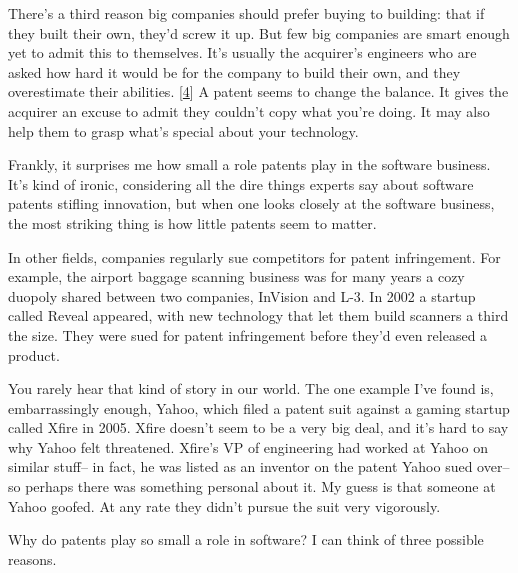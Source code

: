 There's a third reason big companies
                  should prefer buying to building: that if they built their
                  own, they'd screw it up. But few big companies are smart
                  enough yet to admit this to themselves. It's usually the
                  acquirer's engineers who are asked how hard it would be for
                  the company to build their own, and they overestimate their
                  abilities.
                  [\href{\#f4n}{4}]
                  A patent seems to change the balance. It gives the acquirer an
                  excuse to admit they couldn't copy what you're doing. It may
                  also help them to grasp what's special about your
                  technology.

Frankly, it surprises me how small a
                  role patents play in the software business. It's kind of
                  ironic, considering all the dire things experts say about
                  software patents stifling innovation, but when one looks
                  closely at the software business, the most striking thing is
                  how little patents seem to matter.

In other fields,
                  companies regularly sue competitors for patent infringement.
                  For example, the airport baggage scanning business was for
                  many years a cozy duopoly shared between two companies,
                  InVision and L-3. In 2002 a startup called Reveal appeared,
                  with new technology that let them build scanners a third the
                  size. They were sued for patent infringement before they'd
                  even released a product.

You rarely hear that kind
                  of story in our world. The one example I've found is,
                  embarrassingly enough, Yahoo, which filed a patent suit
                  against a gaming startup called Xfire in 2005. Xfire doesn't
                  seem to be a very big deal, and it's hard to say why Yahoo
                  felt threatened. Xfire's VP of engineering had worked at Yahoo
                  on similar stuff-- in fact, he was listed as an inventor on
                  the patent Yahoo sued over-- so perhaps there was something
                  personal about it. My guess is that someone at Yahoo goofed.
                  At any rate they didn't pursue the suit very vigorously.

Why
                  do patents play so small a role in software? I can think of
                  three possible reasons.

